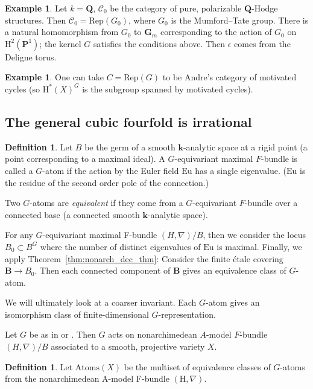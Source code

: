\documentclass[11pt, reqno]{amsart}
\numberwithin{equation}{section}
\theoremstyle{plain}
\theoremstyle{definition}
\newtheorem{definition}[theorem]{Definition}
\newtheorem{example}[theorem]{Example}
\theoremstyle{italicsname}
\newcommand{\bB}{\mathbf{B}}
\newcommand{\Atoms}{\mathrm{Atoms}}
\newcommand{\cC}{\mathscr{C}}
\newcommand{\rH}{\mathrm{H}}
\newcommand{\bG}{\mathbf{G}}
\newcommand{\bP}{\mathbf{P}}
\newcommand{\bQ}{\mathbf{Q}}
\newcommand{\bk}{\mathbf{k}}
\newcommand{\euler}{\mathrm{Eu}}
\begin{document}
\begin{example}
\label{ex:mumford-tate}
    Let $k = \bQ$, $\cC_0$ be the category of pure, polarizable $\bQ$-Hodge structures. Then $\cC_0 = \mathrm{Rep}(G_0)$, where $G_0$ is the Mumford--Tate group. There is a natural homomorphism from $G_0$ to $\bG_m$ corresponding to the action of $G_0$ on $\rH^2(\bP^1)$; the kernel $G$ satisfies the conditions above. Then $\epsilon$ comes from the Deligne torus. 
\end{example}

\begin{example}
\label{ex:motivated-cycle}
    One can take $C = \mathrm{Rep}(G)$ to be Andre's category of motivated cycles (so $\rH^*(X)^G$ is the subgroup spanned by motivated cycles).
\end{example}

\subsection{The general cubic fourfold is irrational}

\begin{definition}
Let $B$ be the germ of a smooth $\bk$-analytic space at a rigid point (a point corresponding to a maximal ideal). A $G$-equivariant maximal $F$-bundle is called a $G$-atom if the action by the Euler field $\euler$ has a single eigenvalue. ($\euler$ is the residue of the second order pole of the connection.)

Two $G$-atoms are \emph{equivalent} if they come from a $G$-equivariant $F$-bundle over a connected base (a connected smooth $\bk$-analytic space).
\end{definition}

For any $G$-equivariant maximal F-bundle $(H, \nabla)/B$, then we consider the locus $B_0 \subset B^G$ where the number of distinct eigenvalues of $\euler$ is maximal. Finally, we apply Theorem~\ref{thm:nonarch_dec_thm}: Consider the finite \'etale covering $\bB \to B_0$. Then each connected component of $\bB$ gives an equivalence class of $G$-atom. 

We will ultimately look at a coarser invariant. Each $G$-atom gives an isomorphism class of finite-dimensional $G$-representation. 

Let $G$ be as in  or . 
Then $G$ acts on nonarchimedean $A$-model $F$-bundle $(H, \nabla)/B$ associated to a smooth, projective variety $X$. 

\begin{definition}
\label{def:atoms}
    Let $\Atoms(X)$ be the multiset of equivalence classes of $G$-atoms from the nonarchimedean A-model F-bundle $(\rH, \nabla)$. 
\end{definition}
\end{document}
